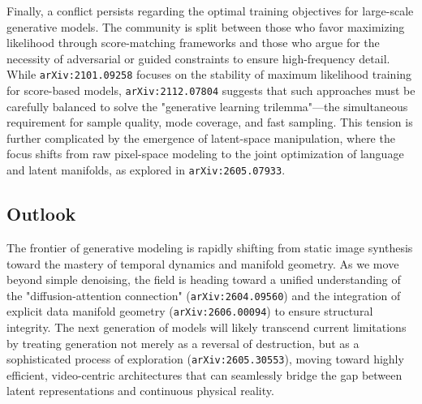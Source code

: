 \documentclass[11pt]{article}
\begin{document}
Finally, a conflict persists regarding the optimal training objectives for large-scale generative models. The community is split between those who favor maximizing likelihood through score-matching frameworks and those who argue for the necessity of adversarial or guided constraints to ensure high-frequency detail. While \texttt{arXiv:2101.09258} focuses on the stability of maximum likelihood training for score-based models, \texttt{arXiv:2112.07804} suggests that such approaches must be carefully balanced to solve the "generative learning trilemma"—the simultaneous requirement for sample quality, mode coverage, and fast sampling. This tension is further complicated by the emergence of latent-space manipulation, where the focus shifts from raw pixel-space modeling to the joint optimization of language and latent manifolds, as explored in \texttt{arXiv:2605.07933}.

\subsection{Outlook}

The frontier of generative modeling is rapidly shifting from static image synthesis toward the mastery of temporal dynamics and manifold geometry. As we move beyond simple denoising, the field is heading toward a unified understanding of the "diffusion-attention connection" (\texttt{arXiv:2604.09560}) and the integration of explicit data manifold geometry (\texttt{arXiv:2606.00094}) to ensure structural integrity. The next generation of models will likely transcend current limitations by treating generation not merely as a reversal of destruction, but as a sophisticated process of exploration (\texttt{arXiv:2605.30553}), moving toward highly efficient, video-centric architectures that can seamlessly bridge the gap between latent representations and continuous physical reality.
\end{document}
